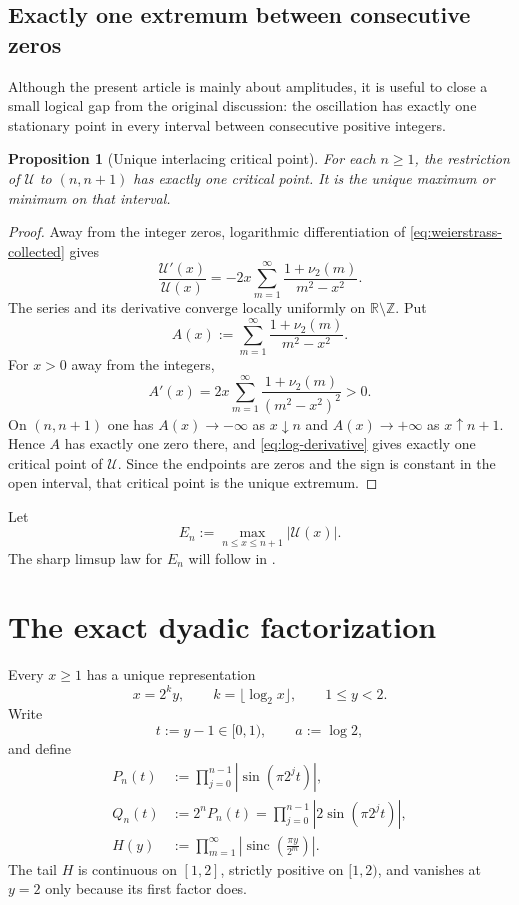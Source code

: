 \documentclass[11pt,oneside]{article}
\newtheorem{proposition}[theorem]{Proposition}
\theoremstyle{definition}
\theoremstyle{remark}
\newcommand{\R}{\mathbb R}
\newcommand{\Z}{\mathbb Z}
\newcommand{\sinc}{\operatorname{sinc}}
\newcommand{\Uhat}{\mathcal U}
\newcommand{\vtwo}{\nu_2}
\begin{document}
\subsection{Exactly one extremum between consecutive zeros}

Although the present article is mainly about amplitudes, it is useful to close a small
logical gap from the original discussion: the oscillation has exactly one stationary
point in every interval between consecutive positive integers.

\begin{proposition}[Unique interlacing critical point]\label{prop:critical}
For each $n\ge1$, the restriction of $\Uhat$ to $(n,n+1)$ has exactly one critical
point.  It is the unique maximum or minimum on that interval.
\end{proposition}

\begin{proof}
Away from the integer zeros, logarithmic differentiation of
\eqref{eq:weierstrass-collected} gives
\begin{equation}\label{eq:log-derivative}
 \frac{\Uhat'(x)}{\Uhat(x)}
 =-2x\sum_{m=1}^{\infty}
 \frac{1+\vtwo(m)}{m^2-x^2}.
\end{equation}
The series and its derivative converge locally uniformly on
$\R\setminus\Z$.  Put
\[
 A(x):=\sum_{m=1}^{\infty}\frac{1+\vtwo(m)}{m^2-x^2}.
\]
For $x>0$ away from the integers,
\[
 A'(x)=2x\sum_{m=1}^{\infty}
 \frac{1+\vtwo(m)}{(m^2-x^2)^2}>0.
\]
On $(n,n+1)$ one has $A(x)\to-\infty$ as $x\downarrow n$ and
$A(x)\to+\infty$ as $x\uparrow n+1$.  Hence $A$ has exactly one zero there, and
\eqref{eq:log-derivative} gives exactly one critical point of $\Uhat$.  Since the
endpoints are zeros and the sign is constant in the open interval, that critical point
is the unique extremum.
\end{proof}

Let
\begin{equation}\label{eq:En}
 E_n:=\max_{n\le x\le n+1}|\Uhat(x)|.
\end{equation}
The sharp limsup law for $E_n$ will follow in .

\section{The exact dyadic factorization}\label{sec:dyadic}

Every $x\ge1$ has a unique representation
\begin{equation}\label{eq:mantissa}
 x=2^k y,\qquad k=\lfloor\log_2x\rfloor,\qquad 1\le y<2.
\end{equation}
Write
\[
 t:=y-1\in[0,1),\qquad a:=\log2,
\]
and define
\begin{align}
 P_n(t)&:=\prod_{j=0}^{n-1}|\sin(\pi2^jt)|,\label{eq:Pn}\\
 Q_n(t)&:=2^nP_n(t)
       =\prod_{j=0}^{n-1}|2\sin(\pi2^jt)|,\label{eq:Qn}\\
 H(y)&:=\prod_{m=1}^{\infty}
 \left|\sinc\!\left(\frac{\pi y}{2^m}\right)\right|.
 \label{eq:H}
\end{align}
The tail $H$ is continuous on $[1,2]$, strictly positive on $[1,2)$, and vanishes at
$y=2$ only because its first factor does.
\end{document}
